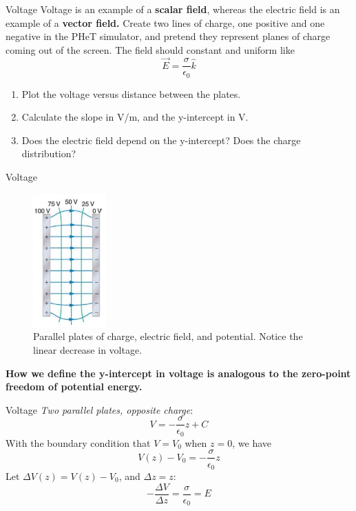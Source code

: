 \documentclass{beamer}
\begin{document}
\begin{frame}{Voltage}
Voltage is an example of a \textbf{scalar field}, whereas the electric field is an example of a \textbf{vector field.}  Create two lines of charge, one positive and one negative in the PHeT simulator, and pretend they represent planes of charge coming out of the screen.  The field should constant and uniform like
\begin{equation}
\vec{E} = \frac{\sigma}{\epsilon_0} \hat{k}
\end{equation}
\begin{enumerate}
\item Plot the voltage versus distance between the plates.
\item Calculate the slope in V/m, and the y-intercept in V.
\item Does the electric field depend on the y-intercept?  Does the charge distribution?
\end{enumerate}
\end{frame}

\begin{frame}{Voltage}
\begin{figure}
\centering
\includegraphics[width=0.25\textwidth]{figures/plates.png}
\caption{\label{fig:plates} Parallel plates of charge, electric field, and potential.  Notice the linear decrease in voltage.}
\end{figure}
\textbf{How we define the y-intercept in voltage is analogous to the zero-point freedom of potential energy.}
\end{frame}

\begin{frame}{Voltage}
\textit{Two parallel plates, opposite charge}:
\begin{equation}
V = -\frac{\sigma}{\epsilon_0}z + C
\end{equation}
With the boundary condition that $V = V_0$ when $z = 0$, we have
\begin{equation}
V(z) - V_0 = -\frac{\sigma}{\epsilon_0}z
\end{equation}
Let $\Delta V(z) = V(z) - V_0$, and $\Delta z = z$:
\begin{equation}
-\frac{\Delta V}{\Delta z} = \frac{\sigma}{\epsilon_0} =  E
\end{equation}
\end{frame}
\end{document}
